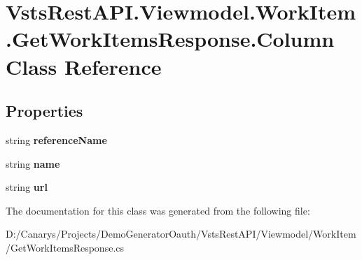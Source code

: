 \hypertarget{class_vsts_rest_a_p_i_1_1_viewmodel_1_1_work_item_1_1_get_work_items_response_1_1_column}{}\section{Vsts\+Rest\+A\+P\+I.\+Viewmodel.\+Work\+Item.\+Get\+Work\+Items\+Response.\+Column Class Reference}
\label{class_vsts_rest_a_p_i_1_1_viewmodel_1_1_work_item_1_1_get_work_items_response_1_1_column}
\subsection*{Properties}
\begin{DoxyCompactItemize}
\item 
\mbox{\label{class_vsts_rest_a_p_i_1_1_viewmodel_1_1_work_item_1_1_get_work_items_response_1_1_column_a5c47788ad3702fbc94f931e59c2c00fc}} 
string {\bfseries reference\+Name}
\item 
\mbox{\label{class_vsts_rest_a_p_i_1_1_viewmodel_1_1_work_item_1_1_get_work_items_response_1_1_column_a25c31255f4bd63e6f73c33c7748f90a8}} 
string {\bfseries name}
\item 
\mbox{\label{class_vsts_rest_a_p_i_1_1_viewmodel_1_1_work_item_1_1_get_work_items_response_1_1_column_a966ad06af96a847b93d38036fc00939d}} 
string {\bfseries url}
\end{DoxyCompactItemize}


The documentation for this class was generated from the following file\+:\begin{DoxyCompactItemize}
\item 
D\+:/\+Canarys/\+Projects/\+Demo\+Generator\+Oauth/\+Vsts\+Rest\+A\+P\+I/\+Viewmodel/\+Work\+Item/Get\+Work\+Items\+Response.\+cs\end{DoxyCompactItemize}
